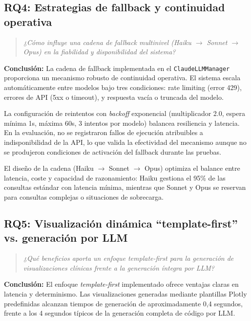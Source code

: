 \subsection{RQ4: Estrategias de fallback y continuidad operativa}

\begin{quote}
\textit{¿Cómo influye una cadena de fallback multinivel (Haiku $\rightarrow$ Sonnet $\rightarrow$ Opus) en la fiabilidad y disponibilidad del sistema?}
\end{quote}

\textbf{Conclusión:} La cadena de fallback implementada en el \texttt{ClaudeLLMManager} proporciona un mecanismo robusto de continuidad operativa. El sistema escala automáticamente entre modelos bajo tres condiciones: rate limiting (error 429), errores de \ac{API} (5xx o timeout), y respuesta vacía o truncada del modelo.

La configuración de reintentos con \textit{backoff} exponencial (multiplicador 2.0, espera mínima 1s, máxima 60s, 3 intentos por modelo) balancea resiliencia y latencia. En la evaluación, no se registraron fallos de ejecución atribuibles a indisponibilidad de la \ac{API}, lo que valida la efectividad del mecanismo aunque no se produjeron condiciones de activación del fallback durante las pruebas.

El diseño de la cadena (Haiku $\rightarrow$ Sonnet $\rightarrow$ Opus) optimiza el balance entre latencia, coste y capacidad de razonamiento: Haiku gestiona el 95\% de las consultas estándar con latencia mínima, mientras que Sonnet y Opus se reservan para consultas complejas o situaciones de sobrecarga.

\subsection{RQ5: Visualización dinámica ``template-first'' vs. generación por LLM}

\begin{quote}
\textit{¿Qué beneficios aporta un enfoque template-first para la generación de visualizaciones clínicas frente a la generación íntegra por \ac{LLM}?}
\end{quote}

\textbf{Conclusión:} El enfoque \textit{template-first} implementado ofrece ventajas claras en latencia y determinismo. Las visualizaciones generadas mediante plantillas Plotly predefinidas alcanzan tiempos de generación de aproximadamente 0,4 segundos, frente a los 4 segundos típicos de la generación completa de código por \ac{LLM}.

